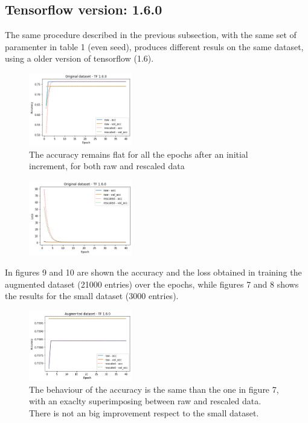 \documentclass[prl,twocolumn]{revtex4-1}
\begin{document}
\subsection{Tensorflow version:  1.6.0}
The same procedure described in the previous subsection, with the same set of paramenter in table 1 (even seed), produces different resuls on the same dataset, using a older version of tensorflow (1.6). \newpage
\begin{figure}[h!!!]
	\includegraphics[width=0.40\textwidth]{small_oldTF.png}
	\caption{The accuracy remains flat for all the epochs after an initial increment, for both raw and rescaled data}
	\label{fig:y}
\end{figure}
\begin{figure}[h!!!]
	\includegraphics[width=0.40\textwidth]{small_oldTFloss.png}
	\caption{}
	\label{fig:y}
\end{figure}
In figures 9 and 10 are shown the accuracy and the loss obtained in training the augmented dataset (21000 entries) over the epochs, while figures 7 and 8 shows the results for the small dataset (3000 entries).
\begin{figure}[h!!]
	\includegraphics[width=0.40\textwidth]{aug_oldTF.png}
	\caption{The behaviour of the accuracy is the same than the one in figure 7, with an exaclty superimposing between raw and rescaled data. There is not an big improvement respect to the small dataset.}
	\label{fig:y}
\end{figure}
\end{document}
